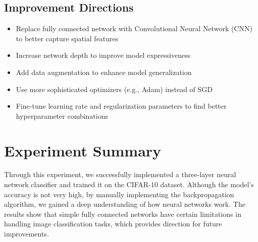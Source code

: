 \documentclass[12pt]{article}
\begin{document}
\subsection{Improvement Directions}
\begin{itemize}
    \item Replace fully connected network with Convolutional Neural Network (CNN) to better capture spatial features
    \item Increase network depth to improve model expressiveness
    \item Add data augmentation to enhance model generalization
    \item Use more sophisticated optimizers (e.g., Adam) instead of SGD
    \item Fine-tune learning rate and regularization parameters to find better hyperparameter combinations
\end{itemize}

\section{Experiment Summary}
Through this experiment, we successfully implemented a three-layer neural network classifier and trained it on the CIFAR-10 dataset. Although the model's accuracy is not very high, by manually implementing the backpropagation algorithm, we gained a deep understanding of how neural networks work. The results show that simple fully connected networks have certain limitations in handling image classification tasks, which provides direction for future improvements.
\end{document}
